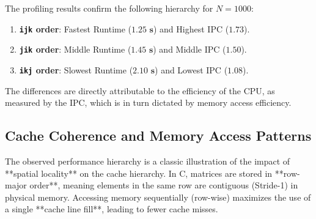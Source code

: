 \documentclass[11pt, a4paper]{article}
\begin{document}
The profiling results confirm the following hierarchy for $N=1000$:
\begin{enumerate}
    \item \textbf{\texttt{ijk} order}: Fastest Runtime ($\mathbf{1.25 \text{ s}}$) and Highest IPC ($\mathbf{1.73}$).
    \item \textbf{\texttt{jik} order}: Middle Runtime ($\mathbf{1.45 \text{ s}}$) and Middle IPC ($\mathbf{1.50}$).
    \item \textbf{\texttt{ikj} order}: Slowest Runtime ($\mathbf{2.10 \text{ s}}$) and Lowest IPC ($\mathbf{1.08}$).
\end{enumerate}
The differences are directly attributable to the efficiency of the CPU, as measured by the IPC, which is in turn dictated by memory access efficiency.

\subsection{Cache Coherence and Memory Access Patterns}

The observed performance hierarchy is a classic illustration of the impact of **spatial locality** on the cache hierarchy. In C, matrices are stored in **row-major order**, meaning elements in the same row are contiguous (Stride-1) in physical memory. Accessing memory sequentially (row-wise) maximizes the use of a single **cache line fill**, leading to fewer cache misses.
\end{document}
